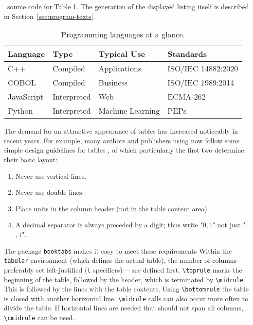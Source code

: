 \begin{program}
    \caption{\latex\ source code for Table \ref{tab:programming-languages}.
    The generation of the displayed listing itself is described in
    Section~\ref{sec:program-texts}.}
    \label{prog:programming-languages-source}
%
\begin{LaTeXCode}[numbers=none]
\begin{table}
    \caption{Programming languages at a glance.}
    \label{tab:programming-languages}
    \centering
    \setlength{\tabcolsep}{10pt} %
    \renewcommand{\arraystretch}{1.25} %
    \begin{tabular}{@{}llll@{}}
        \toprule
        Language   & Type        & Typical Use      & Standards          \\
        \midrule
        C++        & Compiled    & Applications     & ISO/IEC 14882:2020 \\
        COBOL      & Compiled    & Business         & ISO/IEC 1989:2014  \\
        JavaScript & Interpreted & Web              & ECMA-262           \\
        Python     & Interpreted & Machine Learning & PEPs               \\
        \bottomrule
    \end{tabular}
\end{table}
\end{LaTeXCode}
%
\end{program}

The demand for an attractive appearance of tables has increased noticeably in
recent years. For example, many authors and publishers using \latex now
follow some simple design guidelines for tables \cite{Fear2020}, of which
particularly the first two determine their basic layout:

\begin{enumerate}
    \item Never use vertical lines.
    \item Never use double lines.
    \item Place units in the column header (not in the table content area).
    \item A decimal separator is always preceded by a digit; thus write
    "$0{,}1$" not just "${,}1$".
\end{enumerate}


The \latex package \texttt{booktabs} makes it easy to meet these requirements
Within the \texttt{tabular} environment (which defines the actual table), the
number of columns---preferably set left-justified (\texttt{l}
specifiers)--- are defined first. \verb|\toprule| marks the beginning of the
table, followed by the header, which is terminated by \verb|\midrule|. This is
followed by the lines with the table contents. Using \verb|\bottomrule| the
table is closed with another horizontal line. \verb|\midrule| calls can also
occur more often to divide the table. If horizontal lines are needed that should
not span all columns, \verb|\cmidrule| can be used.

